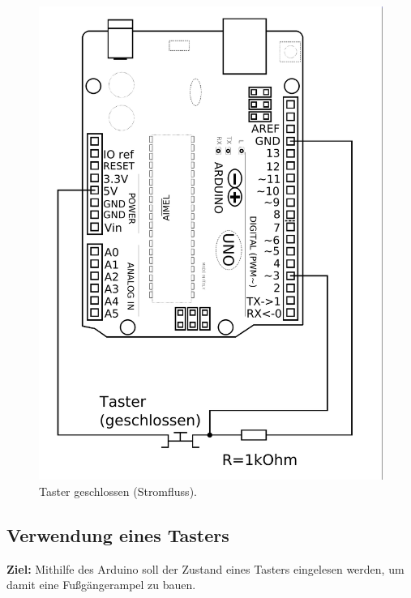 \documentclass[ngerman, 11pt]{scrreprt}
\begin{document}
\begin{figure}[H]
\begin{minipage}{0.4\textwidth}
			\includegraphics[width=\textwidth]{../Zeichnungen/taster-an-arduino-geschlossen.png}
			\caption{Taster geschlossen (Stromfluss).}
		\end{minipage}
		\hfill
	\end{figure}

	\newpage
	\setcounter{page}{16}
	\setcounter{chapter}{3}
	\setcounter{section}{6}
	\setcounter{subsection}{1}
	\subsection{Verwendung eines Tasters}
	
	\begin{ziel}
		\textbf{Ziel:} 	Mithilfe des Arduino soll der Zustand eines Tasters eingelesen werden, um damit eine Fußgängerampel zu bauen.
	\end{ziel}
	
\end{document}
